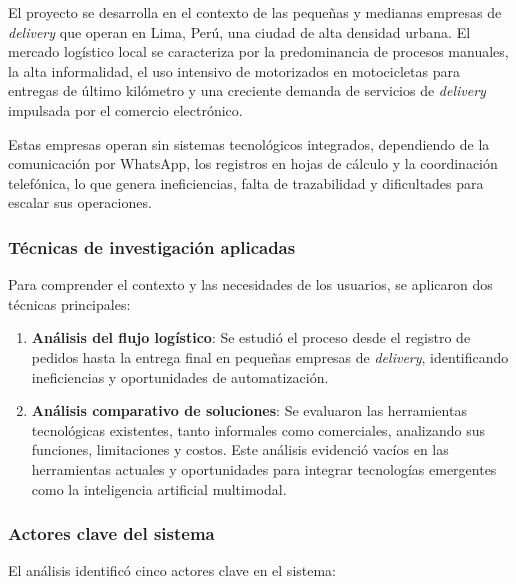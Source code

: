 El proyecto se desarrolla en el contexto de las pequeñas y medianas empresas de \textit{delivery} que operan en Lima, Perú, una ciudad de alta densidad urbana. El mercado logístico local se caracteriza por la predominancia de procesos manuales, la alta informalidad, el uso intensivo de motorizados en motocicletas para entregas de último kilómetro y una creciente demanda de servicios de \textit{delivery} impulsada por el comercio electrónico.

Estas empresas operan sin sistemas tecnológicos integrados, dependiendo de la comunicación por WhatsApp, los registros en hojas de cálculo y la coordinación telefónica, lo que genera ineficiencias, falta de trazabilidad y dificultades para escalar sus operaciones.

\subsubsection{Técnicas de investigación aplicadas}

Para comprender el contexto y las necesidades de los usuarios, se aplicaron dos técnicas principales:

\begin{enumerate}
    \item \textbf{Análisis del flujo logístico}: Se estudió el proceso desde el registro de pedidos hasta la entrega final en pequeñas empresas de \textit{delivery}, identificando ineficiencias y oportunidades de automatización.
    
    \item \textbf{Análisis comparativo de soluciones}: Se evaluaron las herramientas tecnológicas existentes, tanto informales como comerciales, analizando sus funciones, limitaciones y costos. Este análisis evidenció vacíos en las herramientas actuales y oportunidades para integrar tecnologías emergentes como la inteligencia artificial multimodal.
\end{enumerate}

\subsubsection{Actores clave del sistema}

El análisis identificó cinco actores clave en el sistema:

